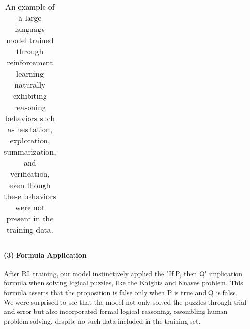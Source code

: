 \begin{table}[H]
\begin{tabular}{p{14cm}}
\\
\hline
\end{tabular}
\vspace{5mm}
\caption{An example of a large language model trained through reinforcement learning naturally exhibiting reasoning behaviors such as hesitation, exploration, summarization, and verification, even though these behaviors were not present in the training data.}
\end{table}

\paragraph{(3) Formula Application}
After RL training, our model instinctively applied the "If P, then Q" implication formula when solving logical puzzles, like the Knights and Knaves problem. This formula asserts that the proposition is false only when P is true and Q is false. We were surprised to see that the model not only solved the puzzles through trial and error but also incorporated formal logical reasoning, resembling human problem-solving, despite no such data included in the training set.

